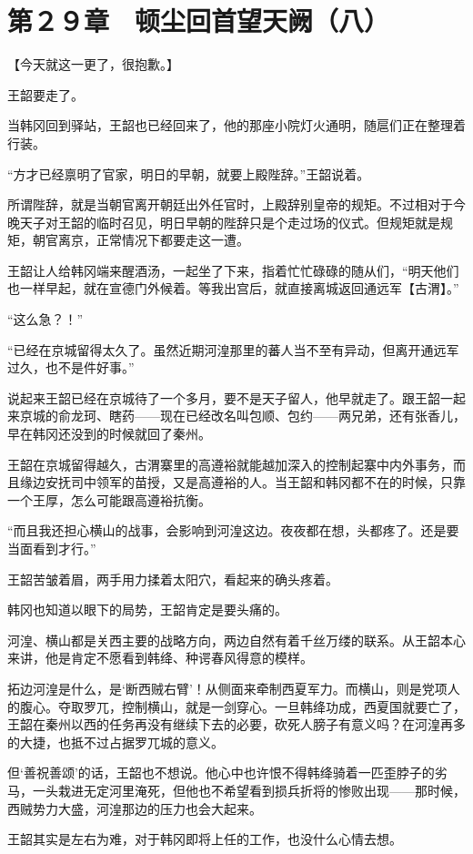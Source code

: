 \section{第２９章　顿尘回首望天阙（八）}

【今天就这一更了，很抱歉。】

王韶要走了。

当韩冈回到驿站，王韶也已经回来了，他的那座小院灯火通明，随扈们正在整理着行装。

“方才已经禀明了官家，明日的早朝，就要上殿陛辞。”王韶说着。

所谓陛辞，就是当朝官离开朝廷出外任官时，上殿辞别皇帝的规矩。不过相对于今晚天子对王韶的临时召见，明日早朝的陛辞只是个走过场的仪式。但规矩就是规矩，朝官离京，正常情况下都要走这一遭。

王韶让人给韩冈端来醒酒汤，一起坐了下来，指着忙忙碌碌的随从们，“明天他们也一样早起，就在宣德门外候着。等我出宫后，就直接离城返回通远军【古渭】。”

“这么急？！”

“已经在京城留得太久了。虽然近期河湟那里的蕃人当不至有异动，但离开通远军过久，也不是件好事。”

说起来王韶已经在京城待了一个多月，要不是天子留人，他早就走了。跟王韶一起来京城的俞龙珂、瞎药——现在已经改名叫包顺、包约——两兄弟，还有张香儿，早在韩冈还没到的时候就回了秦州。

王韶在京城留得越久，古渭寨里的高遵裕就能越加深入的控制起寨中内外事务，而且缘边安抚司中领军的苗授，又是高遵裕的人。当王韶和韩冈都不在的时候，只靠一个王厚，怎么可能跟高遵裕抗衡。

“而且我还担心横山的战事，会影响到河湟这边。夜夜都在想，头都疼了。还是要当面看到才行。”

王韶苦皱着眉，两手用力揉着太阳穴，看起来的确头疼着。

韩冈也知道以眼下的局势，王韶肯定是要头痛的。

河湟、横山都是关西主要的战略方向，两边自然有着千丝万缕的联系。从王韶本心来讲，他是肯定不愿看到韩绛、种谔春风得意的模样。

拓边河湟是什么，是‘断西贼右臂’！从侧面来牵制西夏军力。而横山，则是党项人的腹心。夺取罗兀，控制横山，就是一剑穿心。一旦韩绛功成，西夏国就要亡了，王韶在秦州以西的任务再没有继续下去的必要，砍死人膀子有意义吗？在河湟再多的大捷，也抵不过占据罗兀城的意义。

但‘善祝善颂’的话，王韶也不想说。他心中也许恨不得韩绛骑着一匹歪脖子的劣马，一头栽进无定河里淹死，但他也不希望看到损兵折将的惨败出现——那时候，西贼势力大盛，河湟那边的压力也会大起来。

王韶其实是左右为难，对于韩冈即将上任的工作，也没什么心情去想。

